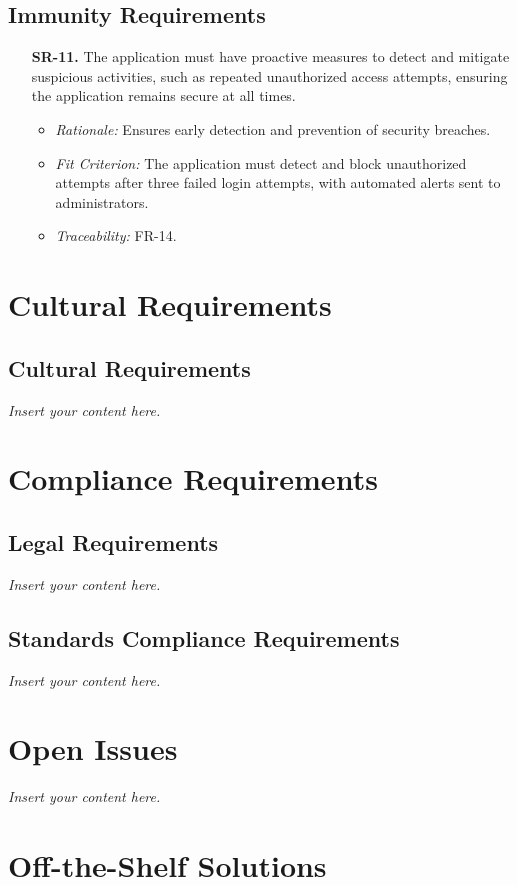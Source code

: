\documentclass[12pt]{article}
\newcommand{\lips}{\textit{Insert your content here.}}
\begin{document}
\subsection{Immunity Requirements}
\begin{enumerate}
  \item[\textbf{SR-11.}] The application must have proactive measures to detect
  and mitigate suspicious activities, such as repeated unauthorized access
  attempts, ensuring the application remains secure at all times.
  \begin{itemize}
    \item \textit{Rationale:} Ensures early detection and prevention of security
    breaches.
    \item \textit{Fit Criterion:} The application must detect and block
    unauthorized attempts after three failed login attempts, with automated
    alerts sent to administrators.
    \item \textit{Traceability:} FR-14.
  \end{itemize}
\end{enumerate}

\section{Cultural Requirements}
\subsection{Cultural Requirements}
\lips

\section{Compliance Requirements}
\subsection{Legal Requirements}
\lips
\subsection{Standards Compliance Requirements}
\lips

\section{Open Issues}
\lips
\section{Off-the-Shelf Solutions}
\end{document}
